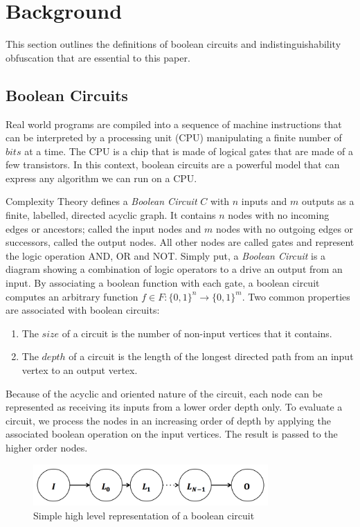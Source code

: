 \section{Background}
This section outlines the definitions of boolean circuits and indistinguishability
obfuscation that are essential to this paper.
\par
\subsection{Boolean Circuits}
Real world programs are compiled into a sequence of machine instructions that can
be interpreted by a processing unit (CPU) manipulating a finite number of $bits$
at a time. The CPU is a chip that is made of logical gates that are made of a few
transistors. In this context, boolean circuits are a powerful model that can express
any algorithm we can run on a CPU\cite{cpu}.
\par
Complexity Theory defines a \textit{Boolean Circuit} $C$ with $n$ inputs and $m$
outputs as a finite, labelled, directed acyclic graph. It contains $n$ nodes with
no incoming edges or ancestors; called the input nodes and $m$ nodes with no outgoing
edges or successors, called the output nodes. All other nodes are called gates and
represent the logic operation AND, OR and NOT\cite{bool}. Simply put, a
\textit{Boolean Circuit}  is a diagram showing a combination of logic operators
to a drive an output from an input. By associating a boolean function with each
gate, a boolean circuit computes an arbitrary function
$f \in F :  \{0,1\}^n \to \{0,1\}^m$. Two common properties are associated with
boolean circuits:
\begin{enumerate}
	\item The $size$ of a circuit is the number of non-input vertices that it contains.
	\item The $depth$ of a circuit is the length of the longest directed path from
	an input vertex to an output vertex.
\end{enumerate}
Because of the acyclic and oriented nature of the circuit, each node can be
represented as receiving its inputs from a lower order depth only. To evaluate a
circuit, we process the nodes in an increasing order of depth by applying the
associated boolean operation on the input vertices. The result is passed to the
higher order nodes.
\par
\begin{figure}[h]
	\center
	\includegraphics[width=0.8\textwidth]{img/graph.png}
	\caption{Simple high level representation of a boolean circuit}
\end{figure}
